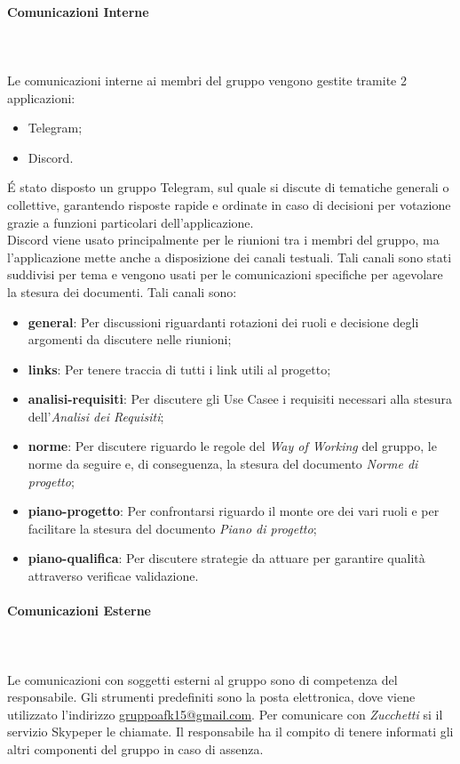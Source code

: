 \paragraph{Comunicazioni Interne}\mbox{} \\ \mbox{} \\
Le comunicazioni interne ai membri del gruppo vengono gestite  tramite 2 applicazioni:
\begin{itemize}
	\item Telegram\glo;
	\item Discord\glo.
\end{itemize}
\'E stato disposto un gruppo Telegram, sul quale si discute di tematiche generali o collettive, garantendo risposte rapide e ordinate in caso di decisioni per votazione grazie a funzioni particolari dell'applicazione. \\
Discord viene usato principalmente per le riunioni tra i membri del gruppo, ma l'applicazione mette anche a disposizione dei canali testuali. Tali canali sono stati suddivisi per tema e vengono usati per le comunicazioni specifiche per agevolare la stesura dei documenti. Tali canali sono:
\begin{itemize}
	\item \textbf{general}: Per discussioni riguardanti rotazioni dei ruoli e decisione degli argomenti da discutere nelle riunioni;
	\item \textbf{links}: Per tenere traccia di tutti i link utili al progetto;
	\item \textbf{analisi-requisiti}: Per discutere gli Use Case\glo e i requisiti necessari alla stesura dell'\textit{Analisi dei Requisiti};
	\item \textbf{norme}: Per discutere riguardo le regole del \textit{Way of Working} del gruppo, le norme da seguire e, di conseguenza, la stesura del documento \textit{Norme di progetto}\glo;
	\item \textbf{piano-progetto}: Per confrontarsi riguardo il monte ore dei vari ruoli e per facilitare la stesura del documento \textit{Piano di progetto}\glo;
	\item \textbf{piano-qualifica}: Per discutere strategie da attuare per garantire qualità attraverso verifica\glo e validazione\glo.
\end{itemize}
\paragraph{Comunicazioni Esterne}\mbox{} \\ \mbox{} \\
Le comunicazioni con soggetti esterni al gruppo sono di competenza del responsabile. Gli strumenti predefiniti sono la posta elettronica, dove viene utilizzato l'indirizzo \href{mailto:gruppoafk15@gmail.com}{gruppoafk15@gmail.com}.
Per comunicare con \textit{Zucchetti} si il servizio Skype\glo per le chiamate. Il responsabile ha il compito di tenere informati gli altri componenti
del gruppo in caso di assenza.


